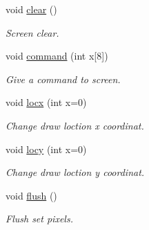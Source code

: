 \begin{DoxyCompactItemize}
void \hyperlink{classnokia5510_a7bb1e454143ff18eef7e26421796be3d}{clear} ()
\begin{DoxyCompactList}\small\item\em Screen clear. \end{DoxyCompactList}\item 
void \hyperlink{classnokia5510_a45b2085b046794537372ddae0073fac1}{command} (int x\mbox{[}8\mbox{]})
\begin{DoxyCompactList}\small\item\em Give a command to screen. \end{DoxyCompactList}\item 
void \hyperlink{classnokia5510_abe3422e972574dea0be82cb999dd14e3}{locx} (int x=0)
\begin{DoxyCompactList}\small\item\em Change draw loction x coordinat. \end{DoxyCompactList}\item 
void \hyperlink{classnokia5510_aad9fe06623ff914e69400c8ee412291b}{locy} (int x=0)
\begin{DoxyCompactList}\small\item\em Change draw loction y coordinat. \end{DoxyCompactList}\item 
void \hyperlink{classnokia5510_ab86f3da997436d067b8d3e9f95de734a}{flush} ()
\begin{DoxyCompactList}\small\item\em Flush set pixels. \end{DoxyCompactList}\end{DoxyCompactItemize}
